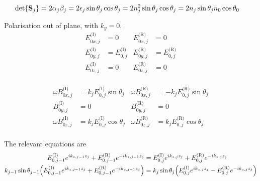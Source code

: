 \begin{align*}
	\det{\vb{S}_j} & = 2\alpha_j\beta_j = 2\epsilon_j\sin\theta_j\cos\theta_j = 2n^2_j\sin\theta_j\cos\theta_j = 2n_j\sin\theta_j n_0\cos\theta_0
\end{align*}

Polarisation out of plane, with $k_y = 0$,
\begin{align*}
	E^{\text{(I)}}_{0x,j} & = 0                    & E^{\text{(R)}}_{0x,j} & = 0                    \\
	E^{\text{(I)}}_{0y,j} & = E^{\text{(I)}}_{0,j} & E^{\text{(R)}}_{0y,j} & = E^{\text{(R)}}_{0,j} \\
	E^{\text{(I)}}_{0z,j} & = 0                    & E^{\text{(R)}}_{0z,j} & = 0                    \\
\end{align*}

\begin{align*}
	\omega B^{\text{(I)}}_{0x,j} & = k_j E^{\text{(I)}}_{0,j}\sin\theta_j & \omega B^{\text{(R)}}_{0x,j} & = -k_j E^{\text{(R)}}_{0,j}\sin\theta_j \\
	B^{\text{(I)}}_{0y,j}        & = 0                                    & B^{\text{(R)}}_{0y,j}        & = 0                                     \\
	\omega B^{\text{(I)}}_{0z,j} & = k_j E^{\text{(I)}}_{0,j}\cos\theta_j & \omega B^{\text{(R)}}_{0z,j} & = k_j E^{\text{(R)}}_{0,j}\cos\theta_j  \\
\end{align*}

The relevant equations are
\begin{align*}
	E^{\text{(I)}}_{0,j-1}e^{ik_{z,j-1}z_j} + E^{\text{(R)}}_{0,j-1}e^{-ik_{z,j-1}z_j}                               & =
	E^{\text{(I)}}_{0,j}e^{ik_{z,j}z_j} + E^{\text{(R)}}_{0,j} e^{-ik_{z,j}z_j}
	\\
	k_{j-1}\sin\theta_{j-1}\pqty{E^{\text{(I)}}_{0,j-1}e^{ik_{z,j-1}z_j} + E^{\text{(R)}}_{0,j-1}e^{-ik_{z,j-1}z_j}} & =
	k_{j}\sin\theta_{j}\pqty{E^{\text{(I)}}_{0,j}e^{ik_{z,j}z_j} - E^{\text{(R)}}_{0,j}e^{-ik_{z,j}z_j}}
\end{align*}

